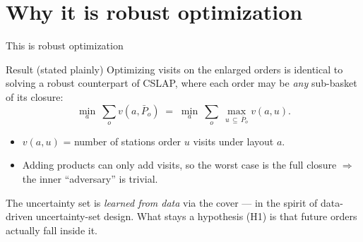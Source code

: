 \documentclass[11pt,aspectratio=169]{beamer}
\begin{document}
\section{Why it is robust optimization}
\begin{frame}{This is robust optimization}
  \begin{block}{Result (stated plainly)}
    Optimizing visits on the enlarged orders is \alert{identical} to solving a
    robust counterpart of CSLAP, where each order may be \emph{any} sub-basket of
    its closure:
    \[
      \min_{a}\ \sum_{o} v\!\left(a,\bar P_o\right)
      \;=\;
      \min_{a}\ \sum_{o}\ \max_{u\,\subseteq\,\bar P_o} v\!\left(a,u\right).
    \]
  \end{block}
  \begin{itemize}
    \item $v(a,u)$ = number of stations order $u$ visits under layout $a$.
    \item Adding products can only add visits, so the worst case is the full
          closure $\Rightarrow$ the inner ``adversary'' is trivial.
  \end{itemize}
  \vspace{0.3em}
  {\footnotesize The uncertainty set is \emph{learned from data} via the cover ---
  in the spirit of data-driven uncertainty-set design. What stays a hypothesis
  (H1) is that future orders actually fall inside it.}
\end{frame}

\end{document}
